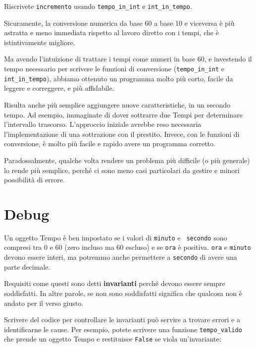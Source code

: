 \documentclass[10pt]{book}
\begin{document}
\vspace{0.2in}
\begin{exercise}

Riscrivete {\tt incremento} usando \verb"tempo_in_int" e \verb"int_in_tempo".

\end{exercise}

Sicuramente, la conversione numerica da base 60 a base 10 e viceversa è più astratta e meno immediata rispetto al lavoro diretto con i tempi, che è istintivamente migliore.

Ma avendo l'intuizione di trattare i tempi come numeri in base 60, e    investendo il tempo necessario per scrivere le funzioni di conversione (\verb"tempo_in_int" e \verb"int_in_tempo"), abbiamo ottenuto un programma molto più corto, facile da leggere e correggere, e più affidabile.

Risulta anche più semplice aggiungere nuove caratteristiche, in un secondo tempo. Ad esempio, immaginate di dover sottrarre due Tempi per determinare l'intervallo trascorso. L'approccio iniziale avrebbe reso necessaria l'implementazione di  una sottrazione con il prestito. Invece, con le funzioni di conversione, è molto più facile e rapido avere un programma corretto.

Paradossalmente, qualche volta rendere un problema più difficile (o più generale) lo rende più semplice, perché ci sono meno casi particolari da gestire e minori possibilità di errore.


\section{Debug}

Un oggetto Tempo è ben impostato se i valori di {\tt minuto} e {\tt
secondo} sono compresi tra 0 e 60 (zero incluso ma 60 escluso) e se 
{\tt ora} è positiva.  {\tt ora} e {\tt minuto} devono essere interi, ma potremmo anche permettere a {\tt secondo} di avere una parte decimale.

Requisiti come questi sono detti {\bf invarianti} perché devono essere sempre soddisfatti. In altre parole, se non sono soddisfatti significa che qualcosa non è andato per il verso giusto.

Scrivere del codice per controllare le invarianti può servire a trovare errori e a identificarne le cause. Per esempio, potete scrivere una funzione
 \verb"tempo_valido" che prende un oggetto Tempo e restituisce
{\tt False} se viola un'invariante:
\end{document}
